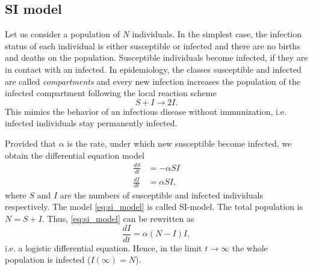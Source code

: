 \subsection{SI model}\label{sec:si_model}
Let us consider a population of $N$ individuals.
In the simplest case, the infection status of each individual is either susceptible or infected and there are no births and deaths on the population.
Susceptible individuals become infected, if they are in contact with an infected.
In epidemiology, the classes susceptible and infected are called \emph{compartments} and every new infection increases the population of the infected compartment following the local reaction scheme
\[
S+I \rightarrow 2 I.
\]
This mimics the behavior of an infectious disease without immunization, i.e. infected individuals stay permanently infected.

Provided that $\alpha $ is the rate, under which new susceptible become infected, we obtain the differential equation model
\begin{align}\label{eq:si_model}
\frac{dS}{dt} &= -\alpha SI \nonumber \\
\frac{dI}{dt} &= \alpha SI,
\end{align}
where $S$ and $I$ are the numbers of susceptible and infected individuals respectively.
The model \eqref{eq:si_model} is called SI-model.
The total population is $N=S+I$.
Thus, \eqref{eq:si_model} can be rewritten as
\[
\frac{dI}{dt}=\alpha (N-I)I,
\]
i.e. a logistic differential equation.
Hence, in the limit $t\rightarrow \infty $ the whole population is infected ($I(\infty )=N$). 

